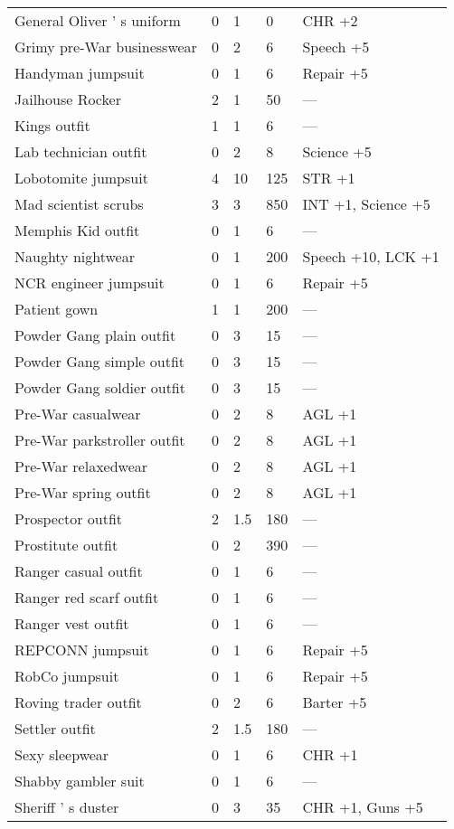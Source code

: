 \documentclass{report}
\begin{document}
\begin{table}[H]
\begin{table}[H]
\begin{table}[H]
\begin{table}[H]
\begin{table}[H]
\begin{table}[H]
\begin{table}[H]
\begin{table}[H]
\begin{table}[H]
\begin{table}[H]
\begin{table}[H]
\begin{table}[H]
\begin{table}[H]
\begin{table}[H]
\begin{table}[H]
\begin{table}[H]
\begin{table}[H]
\begin{table}[H]
\begin{tabular}{p{30mm}p{30mm}p{30mm}p{30mm}p{30mm}}
General Oliver ' s uniform  & 0 & 1 & 0 & CHR +2 \\
Grimy pre-War businesswear  & 0 & 2 & 6 & Speech +5  \\
Handyman jumpsuit  & 0 & 1 & 6 & Repair +5  \\
Jailhouse Rocker  & 2 & 1 & 50 & —  \\
Kings outfit  & 1 & 1 & 6 & —  \\
Lab technician outfit  & 0 & 2 & 8 & Science +5  \\
Lobotomite jumpsuit  & 4 & 10 & 125 & STR +1  \\
Mad scientist scrubs  & 3 & 3 & 850 & INT +1, Science +5  \\
Memphis Kid outfit  & 0 & 1 & 6 & —  \\
Naughty nightwear  & 0 & 1 & 200 & Speech +10, LCK +1  \\
NCR engineer jumpsuit  & 0 & 1 & 6 & Repair +5  \\
Patient gown  & 1 & 1 & 200 & —  \\
Powder Gang plain outfit  & 0 & 3 & 15 & —  \\
Powder Gang simple outfit  & 0 & 3 & 15 & —  \\
Powder Gang soldier outfit  & 0 & 3 & 15 & —  \\
Pre-War casualwear  & 0 & 2 & 8 & AGL +1  \\
Pre-War parkstroller outfit  & 0 & 2 & 8 & AGL +1  \\
Pre-War relaxedwear  & 0 & 2 & 8 & AGL +1  \\
Pre-War spring outfit  & 0 & 2 & 8 & AGL +1  \\
Prospector outfit  & 2 & 1.5  & 180 & —  \\
Prostitute outfit  & 0 & 2 & 390 & —  \\
Ranger casual outfit  & 0 & 1 & 6 & —  \\
Ranger red scarf outfit  & 0 & 1 & 6 & —  \\
Ranger vest outfit  & 0 & 1 & 6 & —  \\
REPCONN jumpsuit  & 0 & 1 & 6 & Repair +5  \\
RobCo jumpsuit  & 0 & 1 & 6 & Repair +5  \\
Roving trader outfit  & 0 & 2 & 6 & Barter +5  \\
Settler outfit  & 2 & 1.5  & 180 & —  \\
Sexy sleepwear  & 0 & 1 & 6 & CHR +1  \\
Shabby gambler suit  & 0 & 1 & 6 & —  \\
Sheriff ' s duster  & 0 & 3 & 35 & CHR +1, Guns +5  \\

\end{tabular}
\end{table}
\end{table}
\end{table}
\end{table}
\end{table}
\end{table}
\end{table}
\end{table}
\end{table}
\end{table}
\end{table}
\end{table}
\end{table}
\end{table}
\end{table}
\end{table}
\end{table}
\end{table}
\end{document}

